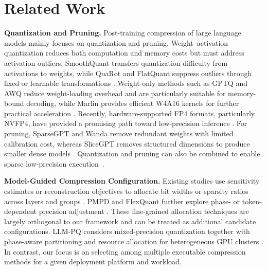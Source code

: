\documentclass[letterpaper]{article} %
\begin{document}
\section{Related Work}
\textbf{Quantization and Pruning. }Post-training compression of large language models mainly focuses on quantization and pruning. Weight–activation quantization reduces both computation and memory costs but must address activation outliers. SmoothQuant transfers quantization difficulty from activations to weights, while QuaRot and FlatQuant suppress outliers through fixed or learnable transformations \cite{xiao2023smoothquant,ashkboos2024quarot,sun2025flatquant}. Weight-only methods such as GPTQ and AWQ reduce weight-loading overhead and are particularly suitable for memory-bound decoding, while Marlin provides efficient W4A16 kernels for further practical acceleration \cite{frantar2023gptq,lin2024awq,frantar2025marlin}. Recently, hardware-supported FP4 formats, particularly NVFP4, have provided a promising path toward low-precision inference \cite{alvarez2025nvfp4}. For pruning, SparseGPT and Wanda remove redundant weights with limited calibration cost, whereas SliceGPT removes structured dimensions to produce smaller dense models \cite{frantar2023sparsegpt,sun2024wanda,ashkboos2024slicegpt}. Quantization and pruning can also be combined to enable sparse low-precision execution~\cite{guo2024jsq}.


\textbf{Model-Guided Compression Configuration.}
Existing studies use sensitivity estimates or reconstruction objectives to allocate bit widths or sparsity ratios across layers and groups \cite{guan2024aptq,huang2025slimllm,yin2024owl,xu2024besa}. PMPD and FlexQuant further explore phase- or token-dependent precision adjustment \cite{chen2025pmpd,liu2025flexquant}. These fine-grained allocation techniques are largely orthogonal to our framework and can be treated as additional candidate configurations. LLM-PQ considers mixed-precision quantization together with phase-aware partitioning and resource allocation for heterogeneous GPU clusters \cite{zhao2024llmpq}. In contrast, our focus is on selecting among multiple executable compression methods for a given deployment platform and workload.
\end{document}
